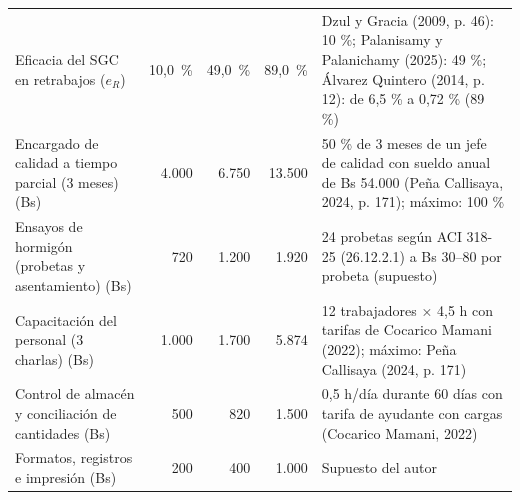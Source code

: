 \begin{longtable}{@{}P{4.3cm}rrrP{6.0cm}@{}}
Eficacia del SGC en retrabajos ($e_R$) & 10,0~\% & 49,0~\% & 89,0~\% & Dzul y Gracia (2009, p. 46): 10 \%; Palanisamy y Palanichamy (2025): 49 \%; Álvarez Quintero (2014, p. 12): de 6,5 \% a 0,72 \% (89 \%) \\
Encargado de calidad a tiempo parcial (3 meses) (Bs) & 4.000 & 6.750 & 13.500 & 50 \% de 3 meses de un jefe de calidad con sueldo anual de Bs 54.000 (Peña Callisaya, 2024, p. 171); máximo: 100 \% \\
Ensayos de hormigón (probetas y asentamiento) (Bs) & 720 & 1.200 & 1.920 & 24 probetas según ACI 318-25 (26.12.2.1) a Bs 30–80 por probeta (supuesto) \\
Capacitación del personal (3 charlas) (Bs) & 1.000 & 1.700 & 5.874 & 12 trabajadores × 4,5 h con tarifas de Cocarico Mamani (2022); máximo: Peña Callisaya (2024, p. 171) \\
Control de almacén y conciliación de cantidades (Bs) & 500 & 820 & 1.500 & 0,5 h/día durante 60 días con tarifa de ayudante con cargas (Cocarico Mamani, 2022) \\
Formatos, registros e impresión (Bs) & 200 & 400 & 1.000 & Supuesto del autor \\
\end{longtable}
